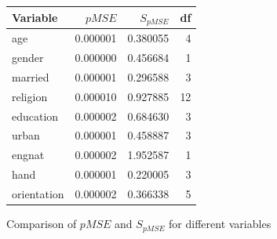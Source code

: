 \documentclass[a0,portrait]{a0poster}
\begin{document}
\begin{multicols}{3}
\vspace{0.5cm}




\begin{center}
\begin{tabular}{lrrr}
  \toprule
Variable & $pMSE$ & $S_{pMSE}$ & df \\ 
  \midrule
  age & 0.000001 & 0.380055 & 4 \\ 
  gender & 0.000000 & 0.456684 & 1 \\ 
  married & 0.000001 & 0.296588 & 3 \\ 
  religion & 0.000010 & 0.927885 & 12 \\ 
  education & 0.000002 & 0.684630 & 3 \\ 
  urban & 0.000001 & 0.458887 & 3 \\ 
  engnat & 0.000002 & 1.952587 & 1 \\ 
  hand & 0.000001 & 0.220005 & 3 \\ 
  orientation & 0.000002 & 0.366338 & 5 \\ 
   \bottomrule
\end{tabular}
\caption{Comparison of $pMSE$ and $S_{pMSE}$  for different variables} 
\label{tab:pmse}
\end{center}

\vspace{0,5cm}


\end{multicols}
\end{document}
